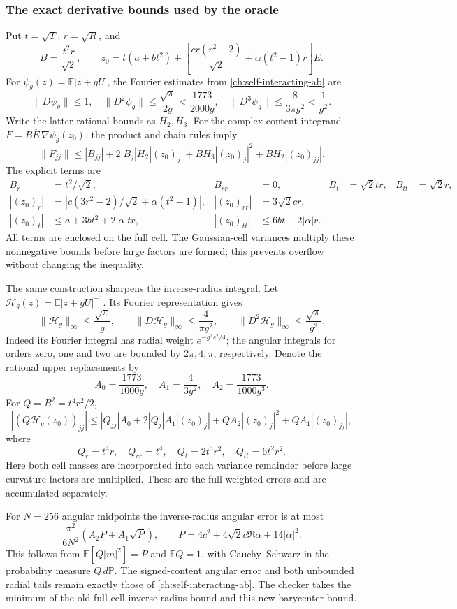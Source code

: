 \subsubsection{The exact derivative bounds used by the oracle}
Put $t=\sqrt T$, $r=\sqrt R$, and
\[
 B=\frac{t^2r}{\sqrt2},\qquad
 z_0=t(a+bt^2)+\left[\frac{cr(r^2-2)}{\sqrt2}
                       +\alpha(t^2-1)r\right]E.
\]
For $\psi_g(z)=\mathbb E|z+gU|$, the Fourier estimates from \autoref{ch:self-interacting-ab} are
\[
 \|D\psi_g\|\le1,\quad
 \|D^2\psi_g\|\le\frac{\sqrt\pi}{2g}<\frac{1773}{2000g},\quad
 \|D^3\psi_g\|\le\frac8{3\pi g^2}<\frac1{g^2}.
\]
Write the latter rational bounds as $H_2,H_3$. For the complex content integrand $F=B\overline E\,\overline{\nabla\psi_g(z_0)}$, the product and chain rules imply
\[
 \|F_{jj}\|\le |B_{jj}|+2|B_j|H_2|(z_0)_j|
       +BH_3|(z_0)_j|^2+BH_2|(z_0)_{jj}|.
\]
The explicit terms are
\begin{align*}
 B_r&=t^2/\sqrt2,& B_{rr}&=0,&
 B_t&=\sqrt2tr,& B_{tt}&=\sqrt2r,\\
 |(z_0)_r|&=\left|c(3r^2-2)/\sqrt2+\alpha(t^2-1)\right|,
 &|(z_0)_{rr}|&=3\sqrt2cr,\\
 |(z_0)_t|&\le a+3bt^2+2|\alpha|tr,
 &|(z_0)_{tt}|&\le6bt+2|\alpha|r.
\end{align*}
All terms are enclosed on the full cell. The Gaussian-cell variances multiply these nonnegative bounds before large factors are formed; this prevents overflow without changing the inequality.

The same construction sharpens the inverse-radius integral. Let $\mathcal H_g(z)=\mathbb E|z+gU|^{-1}$. Its Fourier representation gives
\[
 \|\mathcal H_g\|_\infty\le\frac{\sqrt\pi}{g},\qquad
 \|D\mathcal H_g\|_\infty\le\frac4{\pi g^2},\qquad
 \|D^2\mathcal H_g\|_\infty\le\frac{\sqrt\pi}{g^3}.
\]
Indeed its Fourier integral has radial weight $e^{-g^2s^2/4}$; the angular integrals for orders zero, one and two are bounded by $2\pi,4,\pi$, respectively. Denote the rational upper replacements by
\[
 A_0=\frac{1773}{1000g},\quad A_1=\frac4{3g^2},\quad
 A_2=\frac{1773}{1000g^3}.
\]
For $Q=B^2=t^4r^2/2$,
\[
 |(Q\mathcal H_g(z_0))_{jj}|
 \le |Q_{jj}|A_0+2|Q_j|A_1|(z_0)_j|
       +QA_2|(z_0)_j|^2+QA_1|(z_0)_{jj}|,
\]
where
\[
 Q_r=t^4r,\quad Q_{rr}=t^4,\quad
 Q_t=2t^3r^2,\quad Q_{tt}=6t^2r^2.
\]
Here both cell masses are incorporated into each variance remainder before large curvature factors are multiplied. These are the full weighted errors and are accumulated separately.

For $N=256$ angular midpoints the inverse-radius angular error is at most
\[
 \frac{\pi^2}{6N^2}\left(A_2P+A_1\sqrt P\right),\qquad
 P=4c^2+4\sqrt2c\Re\alpha+14|\alpha|^2.
\]
This follows from $\mathbb E[Q|m|^2]=P$ and $\mathbb E Q=1$, with Cauchy--Schwarz in the probability measure $Q\,d\mathbb P$. The signed-content angular error and both unbounded radial tails remain exactly those of \autoref{ch:self-interacting-ab}. The checker takes the minimum of the old full-cell inverse-radius bound and this new barycenter bound.


